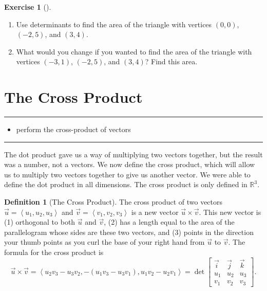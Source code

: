 \documentclass[10pt,]{book}
\theoremstyle{plain}
\theoremstyle{definition}
\newtheorem{definition}[theorem]{Definition}
\theoremstyle{definition}
\theoremstyle{definition}
\theoremstyle{definition}
\newtheorem{exploration}[project]{Exercise}
\newenvironment{objectives}[1]{\noindent\rule{\linewidth}{0.1ex}\newline{\textbf{{\large#1}}\par\smallskip}}{\par\noindent\rule{\linewidth}{0.1ex}\par\smallskip}
\theoremstyle{definition}
\numberwithin{equation}{section}
\newcommand{\lt}{<}
\newcommand{\amp}{&}
\begin{document}
\begin{exploration}[]\label{exploration-40}
\leavevmode%
\begin{enumerate}[font=\bfseries,label=(\alph*),ref=\alph*]
\item\label{task-72} Use determinants to find the area of the triangle with vertices \((0,0)\), \((-2,5)\), and \((3,4)\).%
\item\label{task-73} What would you change if you wanted to find the area of the triangle with vertices \((-3,1)\), \((-2,5)\), and \((3,4)\)? Find this area.%
\end{enumerate}
\end{exploration}
\typeout{************************************************}
\typeout{************************************************}
\section[{The Cross Product}]{The Cross Product}\label{ch02_4_crossproduct}
\begin{objectives}{Objectives: Topical}\label{objectives-5}
%
\begin{itemize}[label=\textbullet]
\item{}perform the cross-product of vectors%
\end{itemize}
\end{objectives}
The dot product gave us a way of multiplying two vectors together, but the result was a number, not a vectors. We now define the cross product, which will allow us to multiply two vectors together to give us another vector. We were able to define the dot product in all dimensions. The cross product is only defined in \(\mathbb{R}^3\).%
\begin{definition}[{The Cross Product}]\label{cross_def}
The cross product of two vectors \(\vec u = \left\lt u_1,u_2,u_3\right>\) and \(\vec v = \left\lt v_1,v_2,v_3\right>\) is a new vector \(\vec u\times \vec v\). This new vector is (1) orthogonal to both \(\vec u\) and \(\vec v\), (2) has a length equal to the area of the parallelogram whose sides are these two vectors, and (3) points in the direction your thumb points as you curl the base of your right hand from \(\vec u\) to \(\vec v\). The formula for the cross product is%
\begin{equation*}
\vec u\times \vec v = \left\lt u_2v_3-u_3v_2,-(u_1v_3-u_3v_1),u_1v_2-u_2v_1\right> = \det\begin{bmatrix}\vec i \amp  \vec j\amp \vec k\\ u_1\amp u_2\amp u_3\\ v_1\amp v_2\amp v_3
\end{bmatrix} .
\end{equation*}
%
\end{definition}
\typeout{************************************************}
\typeout{************************************************}
\end{document}
